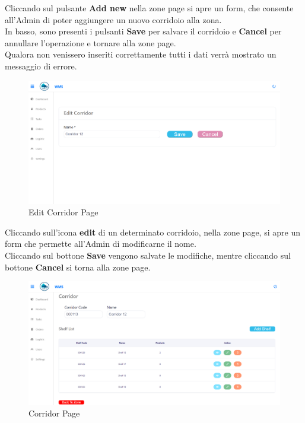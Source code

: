 Cliccando sul pulsante \textbf{Add new} nella zone page si apre un form, che consente
all'Admin di poter aggiungere un nuovo corridoio alla zona.\\
In basso, sono presenti i pulsanti \textbf{Save} per salvare il corridoio e \textbf{Cancel} per annullare l'operazione
e tornare alla zone page.\\
Qualora non venissero inseriti correttamente tutti i dati verrà mostrato un messaggio di errore.

\begin{figure}[H]
    \centering
    \includegraphics[width=\textwidth]{document/sections/img/Storyboard/editCorridorPage.png}
    \caption{Edit Corridor Page}
    \label{fig:editCorridorPage}
\end{figure}

Cliccando sull'icona \textbf{edit} di un determinato corridoio, nella zone page, si apre un form
che permette all'Admin di modificarne il nome.\\
Cliccando sul bottone \textbf{Save} vengono salvate le modifiche, mentre cliccando sul bottone \textbf{Cancel} si torna alla zone page.

\begin{figure}[H]
    \centering
    \includegraphics[width=\textwidth]{document/sections/img/Storyboard/viewCorridor.png}
    \caption{Corridor Page}
    \label{fig:corridorPage}
\end{figure}

